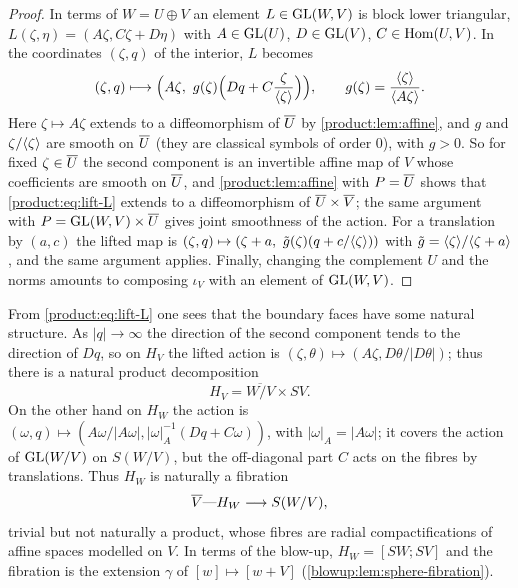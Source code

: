 \begin{proof}
In terms of $W=U\oplus V$ an element $L\in\operatorname{GL}(W,V)$ is block lower triangular,
$L(\zeta,\eta)=(A\zeta,C\zeta+D\eta)$ with $A\in\operatorname{GL}(U)$, $D\in\operatorname{GL}(V)$, $C\in\operatorname{Hom}(U,V)$.
In the coordinates $(\zeta,q)$ of the interior, $L$ becomes
\begin{equation}\label{product:eq:lift-L}
(\zeta,q)\longmapsto\Big(A\zeta,\ g(\zeta)\Big(Dq+C\frac\zeta{\ang\zeta}\Big)\Big),
\qquad g(\zeta)=\frac{\ang\zeta}{\ang{A\zeta}}.
\end{equation}
Here $\zeta\mapsto A\zeta$ extends to a diffeomorphism of $\overline{U}$ by
\cref{product:lem:affine}, and $g$ and $\zeta/\langle \zeta\rangle$ are smooth on $\overline{U}$ (they
are classical symbols of order $0$), with $g>0$. So for fixed $\zeta\in\overline{U}$ the
second component is an invertible affine map of $V$ whose coefficients are smooth
on $\overline{U}$, and \cref{product:lem:affine} with $P=\overline{U}$ shows that
\eqref{product:eq:lift-L} extends to a diffeomorphism of $\overline{U}\times\overline{V}$; the
same argument with $P=\operatorname{GL}(W,V)\times\overline{U}$ gives joint smoothness of the action.
For a translation by $(a,c)$ the lifted map is
$(\zeta,q)\mapsto(\zeta+a,\ \tilde g(\zeta)(q+c/\ang\zeta))$ with
$\tilde g=\langle \zeta\rangle/\langle \zeta+a\rangle$, and the same argument applies. Finally,
changing the complement $U$ and the norms amounts to composing $\iota_V$ with an
element of $\operatorname{GL}(W,V)$.
\end{proof}

From \eqref{product:eq:lift-L} one sees that the boundary faces have some natural
structure. As $|q|\to\infty$ the direction of the second component tends to the
direction of $Dq$, so on $H_V$ the lifted action is $(\zeta,\theta)\mapsto
(A\zeta,D\theta/|D\theta|)$; thus there is a natural product decomposition
\begin{equation}\label{product:eq:HV}
H_V=\overline{W/V}\times SV.
\end{equation}
On the other hand on $H_W$ the action is $(\omega,q)\mapsto(A\omega/|A\omega|,
|\omega|_A^{-1}(Dq+C\omega))$, with $|\omega|_A=|A\omega|$; it covers the action
of $\operatorname{GL}(W/V)$ on $S(W/V)$, but the off-diagonal part $C$ acts on the fibres by
translations. Thus $H_W$ is naturally a fibration
\begin{equation}\label{product:eq:HW}
\overline{V}\text{---}H_W\longrightarrow S(W/V),
\end{equation}
trivial but not naturally a product, whose fibres are radial compactifications
of affine spaces modelled on $V$. In terms of the blow-up, $H_W=[SW;SV]$ and the
fibration is the extension $\gamma$ of $[w]\mapsto[w+V]$ (\cref{blowup:lem:sphere-fibration}).

